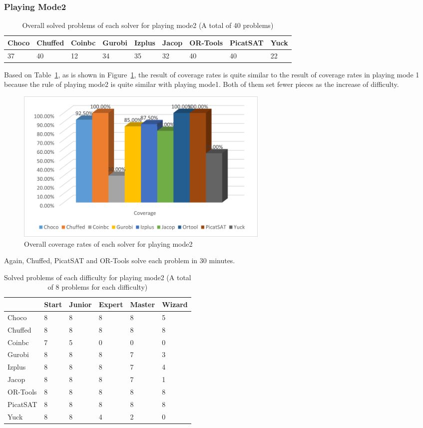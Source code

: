 \subsubsection{Playing Mode2}
\begin{table}[H]
\centering
\caption{Overall solved problems of each solver for playing mode2 (A total of 40 problems)}
\label{tab:solvedproblem2}
\begin{tabular}{|l|l|l|l|l|l|l|l|l|}
\hline
Choco & Chuffed & Coinbc& Gurobi & Izplus&Jacop& OR-Tools& PicatSAT&Yuck \\
\hline
37   &40      & 12    & 34    &35     &32   &40    &40      &22\\
\hline
\end{tabular}
\end{table}
Based on Table~\ref{tab:solvedproblem2}, as is shown in Figure~\ref{fig:mode2eva2}, the result of coverage rates is quite similar to the result of coverage rates in playing mode 1 because the rule of playing mode2 is quite similar with playing mode1. Both of them set fewer pieces as the increase of difficulty.
\begin{figure}[H]
     \centering
    \includegraphics[width=0.6\textwidth]{figs/mode2coverage.png}
    \caption{Overall coverage rates of each solver for playing mode2}
    \label{fig:mode2eva2}
\end{figure}
Again, Chuffed, PicatSAT and OR-Tools solve each problem in 30 minutes. 
\begin{table}[H]
\centering
\caption{Solved problems of each difficulty for playing mode2 (A total of 8 problems for each difficulty)}
\label{tab:solvedproblemforeach difficulty2}
\begin{tabular}{|l|l|l|l|l|l|}
\hline
	    &Start	&Junior	&Expert	&Master	&Wizard\\
\hline
Choco	&8	&8	&8	&8	&5\\
\hline
Chuffed	&8	&8	&8	&8	&8\\
\hline
Coinbc	&7	&5	&0	&0	&0\\
\hline
Gurobi	&8	&8	&8	&7	&3\\
\hline
Izplus	&8	&8	&8	&7	&4\\
\hline
Jacop	&8	&8	&8	&7	&1\\
\hline
OR-Tools	&8	&8	&8	&8	&8\\
\hline
PicatSAT	&8	&8	&8	&8	&8\\
\hline
Yuck	&8	&8	&4	&2	&0\\
\hline
\end{tabular}
\end{table}
